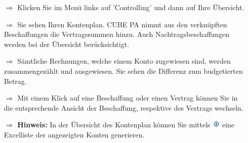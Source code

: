 \documentclass{article}
\begin{document}
\begin{multicols}{2}

\begin{tcolorbox}[colback=blue!5,colframe=blue!40!black,title=Rechnungskontrolle]
\begin{itemize}
  \item[$\Longrightarrow$] Klicken Sie im Menü links auf 'Controlling' und dann auf Ihre Übersicht.
	\item[$\Longrightarrow$] Sie sehen Ihren Kontenplan. CUBE PA nimmt aus den verknüpften Beschaffungen die Vertragssummen hinzu. Auch Nachtragsbeschaffungen werden bei der Übersicht berücksichtigt.
  \item[$\Longrightarrow$] Sämtliche Rechnungen, welche einem Konto zugewiesen sind, werden zusammengezählt und ausgewiesen. Sie sehen die Differenz zum budgetierten Betrag.
  \item[$\Longrightarrow$] Mit einem Klick auf eine Beschaffung oder einen Vertrag können Sie in die entsprechende Ansicht der Beschaffung, respektive des Vertrags wechseln.
  \item[$\Longrightarrow$] \textbf{Hinweis:} In der Übersicht des Kontenplan können Sie mittels \includegraphics[height=10pt]{Icons/ListeGenerieren.jpg} eine Excelliste der angezeigten Konten generieren.

\end{itemize}
\end{tcolorbox}



\end{multicols}
\end{document}
